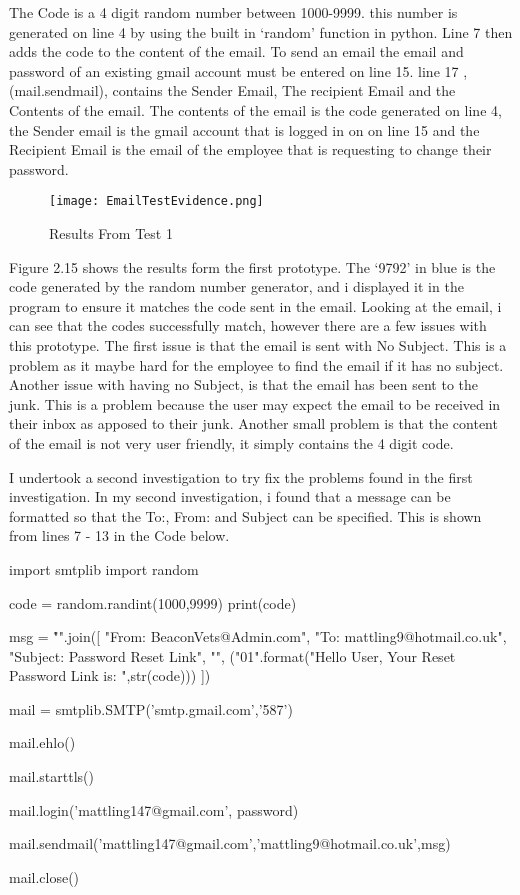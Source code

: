 The Code is a 4 digit random number between 1000-9999. this number is generated on line 4 by using the built in `random' function in python. Line 7 then adds the code to the content of the email. To send an email the email and password of an existing gmail account must be entered on line 15. line 17 , (mail.sendmail), contains the Sender Email, The recipient Email and the Contents of the email. The contents of the email is the code generated on line 4, the Sender email is the gmail account that is logged in on on line 15 and the Recipient Email is the email of the employee that is requesting to change their password.


\begin{figure}[H]
\caption{Results From Test 1} \label{fig:Results From Test 1}
\hfill\texttt{[image: EmailTestEvidence.png]}\hspace*{\fill}
\end{figure}


Figure 2.15 shows the results form the first prototype. The `9792' in blue is the code generated by the random number generator, and i displayed it in the program to ensure it matches the code sent in the email. Looking at the email, i can see that the codes successfully match, however there are a few issues with this prototype. The first issue is that the email is sent with No Subject. This is a problem as it maybe hard for the employee to find the email if it has no subject. Another issue with having no Subject, is that the email has been sent to the junk. This is a problem because the user may expect the email to be received in their inbox as apposed to their junk. Another small problem is that the content of the email is not very user friendly, it simply contains the 4 digit code. \par

\pagebreak

I undertook a second investigation to try fix the problems found in the first investigation. In my second investigation, i found that a message can be formatted so that the To:, From: and Subject can be specified. This is shown from lines 7 - 13 in the Code below.

\begin{python}
import smtplib
import random

code = random.randint(1000,9999)
print(code)

msg = "\r\n".join([
  "From: BeaconVets@Admin.com",
  "To: mattling9@hotmail.co.uk",
  "Subject: Password Reset Link",
  "",
  ("{0}{1}".format("Hello User, \n \n Your Reset Password Link is:  ",str(code)))
  ])

mail = smtplib.SMTP('smtp.gmail.com','587')

mail.ehlo()

mail.starttls()

mail.login('mattling147@gmail.com', password)

mail.sendmail('mattling147@gmail.com','mattling9@hotmail.co.uk',msg)

mail.close()

\end{python}


